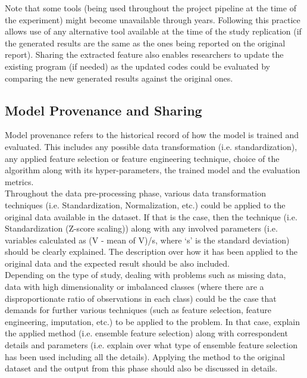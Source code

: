     Note that some tools (being used throughout the project pipeline at the time of the experiment) might become unavailable through years. 
    Following this practice allows use of any alternative tool available at the time of the study replication (if the generated results are 
    the same as the ones being reported on the original report). Sharing the extracted feature also enables researchers to update the existing 
    program (if needed) as the updated codes could be evaluated by comparing the new generated results against the original ones.
    
\subsection{Model Provenance and Sharing}
    Model provenance refers to the historical record of how the model is trained and evaluated. This includes any possible 
    data transformation (i.e. standardization), any applied feature selection or feature engineering technique, choice of 
    the algorithm along with its hyper-parameters, the trained model and the evaluation metrics.\\
    
    Throughout the data pre-processing phase, various data transformation techniques (i.e. Standardization, Normalization, etc.)
    could be applied to the original data available in the dataset. If that is the case, then the technique 
    (i.e. Standardization (Z-score scaling)) along with any involved parameters 
    (i.e. variables calculated as (V - mean of V)/s, where `s' is the standard deviation)
    should be clearly explained. The description over how it has been applied to the original data  and the expected result 
    should be also included.\\
    
    Depending on the type of study, dealing with problems such as missing data, data with high dimensionality or imbalanced classes 
    (where there are a disproportionate ratio of observations in each class) could be the case that demands for further various techniques 
    (such as feature selection, feature engineering, imputation, etc.) to be applied to the problem. In that case, explain the applied method 
    (i.e. ensemble feature selection) along with correspondent details and parameters (i.e. explain over what type of ensemble feature selection 
    has been used including all the details). Applying the method to the original dataset and the output from this phase should also be 
    discussed in details.\\
    

